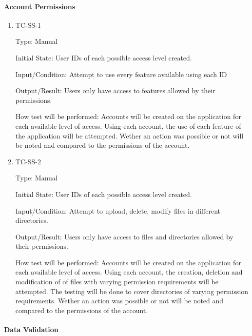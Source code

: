 \documentclass[12pt, titlepage]{article}
\begin{document}
\paragraph{Account Permissions}

\begin{enumerate}

  \item{TC-SS-1\\}

    Type: Manual

    Initial State: User IDs of each possible access level created.

    Input/Condition: Attempt to use every feature available using each ID

    Output/Result: Users only have access to features allowed by
    their permissions.

    How test will be performed: Accounts will be created on the
    application for each available level of access. Using each
    account, the use of each feature of the application will be
    attempted. Wether an action was possible or not will be noted and
    compared to the permissions of the account.

  \item{TC-SS-2\\}

    Type: Manual

    Initial State: User IDs of each possible access level created.

    Input/Condition: Attempt to upload, delete, modify files in
    different directories.

    Output/Result: Users only have access to files and directories
    allowed by their permissions.

    How test will be performed: Accounts will be created on the
    application for each available level of access. Using each
    account, the creation, deletion and modification of of files with
    varying permission requirements will be attempted. The testing
    will be done to cover directories of varying permission
    requirements. Wether an action was possible or not will be noted
    and compared to the permissions of the account.

\end{enumerate}

\paragraph{Data Validation}
\end{document}
